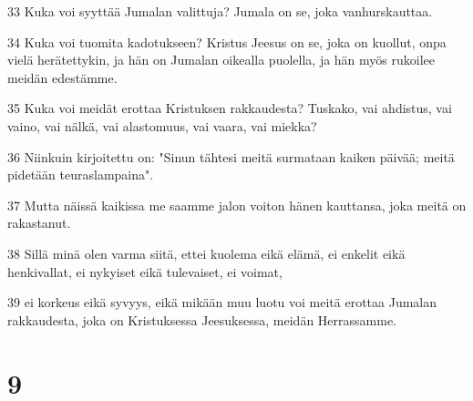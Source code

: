 \par 33 Kuka voi syyttää Jumalan valittuja? Jumala on se, joka vanhurskauttaa.
\par 34 Kuka voi tuomita kadotukseen? Kristus Jeesus on se, joka on kuollut, onpa vielä herätettykin, ja hän on Jumalan oikealla puolella, ja hän myös rukoilee meidän edestämme.
\par 35 Kuka voi meidät erottaa Kristuksen rakkaudesta? Tuskako, vai ahdistus, vai vaino, vai nälkä, vai alastomuus, vai vaara, vai miekka?
\par 36 Niinkuin kirjoitettu on: "Sinun tähtesi meitä surmataan kaiken päivää; meitä pidetään teuraslampaina".
\par 37 Mutta näissä kaikissa me saamme jalon voiton hänen kauttansa, joka meitä on rakastanut.
\par 38 Sillä minä olen varma siitä, ettei kuolema eikä elämä, ei enkelit eikä henkivallat, ei nykyiset eikä tulevaiset, ei voimat,
\par 39 ei korkeus eikä syvyys, eikä mikään muu luotu voi meitä erottaa Jumalan rakkaudesta, joka on Kristuksessa Jeesuksessa, meidän Herrassamme.

\chapter{9}


